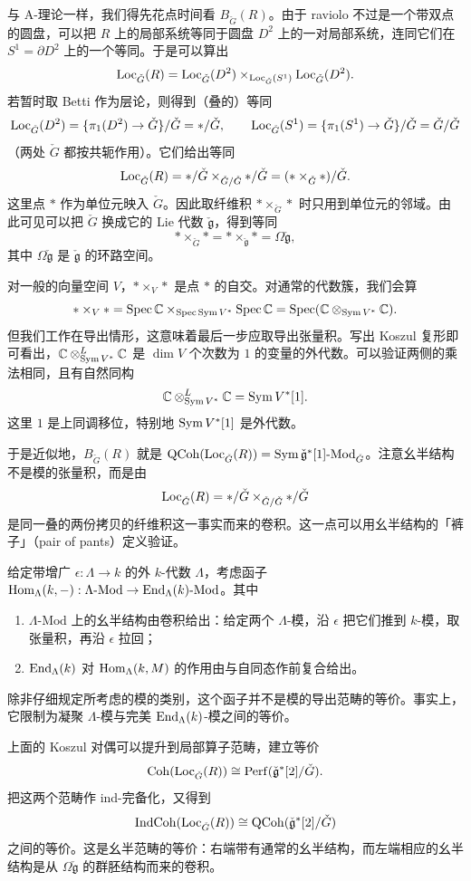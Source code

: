 与 A-理论一样，我们得先花点时间看 $B_{\check G}(R)$。由于 raviolo 不过是一个带双点的圆盘，可以把 $R$ 上的局部系统等同于圆盘 $D^2$ 上的一对局部系统，连同它们在 $S^1=\partial D^2$ 上的一个等同。于是可以算出
\[
  \operatorname{Loc}_{\check G}(R)=\operatorname{Loc}_{\check G}(D^2)\times_{\operatorname{Loc}_{\check G}(S^1)}\operatorname{Loc}_{\check G}(D^2).
\]
若暂时取 Betti 作为层论，则得到（叠的）等同
\[
  \operatorname{Loc}_{\check G}(D^2)=\{\pi_1(D^2)\to\check G\}/\check G=*/\check G,\qquad
  \operatorname{Loc}_{\check G}(S^1)=\{\pi_1(S^1)\to\check G\}/\check G=\check G/\check G
\]
（两处 $\check G$ 都按共轭作用）。它们给出等同
\[
  \operatorname{Loc}_{\check G}(R)=*/\check G\times_{\check G/\check G}*/\check G=(*\times_{\check G}*)/\check G.
\]
这里点 $*$ 作为单位元映入 $\check G$。因此取纤维积 $*\times_{\check G}*$ 时只用到单位元的邻域。由此可见可以把 $\check G$ 换成它的 Lie 代数 $\check{\mathfrak g}$，得到等同
\[
  *\times_{\check G}*=*\times_{\check{\mathfrak g}}*=\Omega\check{\mathfrak g},
\]
其中 $\Omega\check{\mathfrak g}$ 是 $\check{\mathfrak g}$ 的环路空间。

对一般的向量空间 $V$，$*\times_V*$ 是点 $*$ 的自交。对通常的代数簇，我们会算
\[
  *\times_V*=\operatorname{Spec}\mathbb C\times_{\operatorname{Spec}\operatorname{Sym} V^*}\operatorname{Spec}\mathbb C=\operatorname{Spec}(\mathbb C\otimes_{\operatorname{Sym} V^*}\mathbb C).
\]
但我们工作在导出情形，这意味着最后一步应取导出张量积。写出 Koszul 复形即可看出，$\mathbb C\otimes^L_{\operatorname{Sym} V^*}\mathbb C$ 是 $\dim V$ 个次数为 $1$ 的变量的外代数。可以验证两侧的乘法相同，且有自然同构
\[
  \mathbb C\otimes^L_{\operatorname{Sym} V^*}\mathbb C=\operatorname{Sym} V^*[1].
\]
这里 $1$ 是上同调移位，特别地 $\operatorname{Sym} V^*[1]$ 是外代数。

于是近似地，$B_{\check G}(R)$ 就是 $\operatorname{QCoh}(\operatorname{Loc}_{\check G}(R))=\operatorname{Sym}\check{\mathfrak g}^*[1]\text{-}\mathrm{Mod}_{\check G}$。注意幺半结构不是模的张量积，而是由
\[
  \operatorname{Loc}_{\check G}(R)=*/\check G\times_{\check G/\check G}*/\check G
\]
是同一叠的两份拷贝的纤维积这一事实而来的卷积。这一点可以用幺半结构的「裤子」（pair of pants）定义验证。

\begin{rem}[Koszul 对偶]
给定带增广 $\epsilon:\Lambda\to k$ 的外 $k$-代数 $\Lambda$，考虑函子 $\operatorname{Hom}_\Lambda(k,-):\Lambda\text{-}\mathrm{Mod}\to\operatorname{End}_\Lambda(k)\text{-}\mathrm{Mod}$。其中
\begin{enumerate}[label=(\arabic*),leftmargin=1.8em,itemsep=0.2em]
  \item $\Lambda\text{-}\mathrm{Mod}$ 上的幺半结构由卷积给出：给定两个 $\Lambda$-模，沿 $\epsilon$ 把它们推到 $k$-模，取张量积，再沿 $\epsilon$ 拉回；
  \item $\operatorname{End}_\Lambda(k)$ 对 $\operatorname{Hom}_\Lambda(k,M)$ 的作用由与自同态作前复合给出。
\end{enumerate}
除非仔细规定所考虑的模的类别，这个函子并不是模的导出范畴的等价。事实上，它限制为凝聚 $\Lambda$-模与完美 $\operatorname{End}_\Lambda(k)$-模之间的等价。

上面的 Koszul 对偶可以提升到局部算子范畴，建立等价
\[
  \operatorname{Coh}(\operatorname{Loc}_{\check G}(R))\cong\operatorname{Perf}(\check{\mathfrak g}^*[2]/\check G).
\]
把这两个范畴作 ind-完备化，又得到
\[
  \operatorname{IndCoh}(\operatorname{Loc}_{\check G}(R))\cong\operatorname{QCoh}(\check{\mathfrak g}^*[2]/\check G)
\]
之间的等价。这是幺半范畴的等价：右端带有通常的幺半结构，而左端相应的幺半结构是从 $\Omega\check{\mathfrak g}$ 的群胚结构而来的卷积。
\end{rem}

